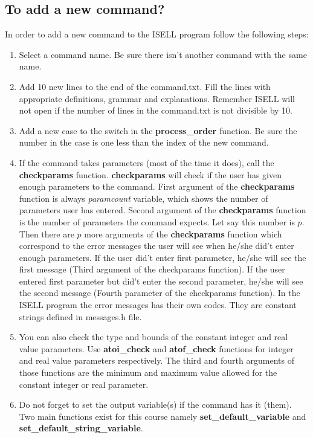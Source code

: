 \documentclass[a4paper,12pt]{book}
\begin{document}
\subsection{To add a new command?}
\label{sec-addcommand}
In order to add a new command to the ISELL program follow the following steps:
\begin{enumerate}
\item Select a command name. Be sure there isn't another command with the same name.
\item Add 10 new lines to the end of the command.txt. Fill the lines with appropriate definitions, grammar and explanations. Remember ISELL will not open if the number of lines in the command.txt is not divisible by 10.
\item Add a new case to the switch in the {\bf process\_order} function. Be sure the number in the case is one less than the index of the new command.
\item If the command takes parameters (most of the time it does), call the {\bf checkparams} function. {\bf checkparams} will check if the user has given enough parameters to the command. First argument of the {\bf checkparams} function is always {\em paramcount} variable, which shows the number of parameters user has entered. Second argument of the {\bf checkparams} function is the number of parameters the command expects. Let say this number is $p$. Then there are $p$ more arguments of the {\bf checkparams} function which correspond to the error messages the user will see when he/she did't enter enough parameters. If the user did't enter first parameter, he/she will see the first message (Third argument of the checkparams function). If the user entered first parameter but did't enter the second parameter, he/she will see the second message (Fourth parameter of the checkparams function). In the ISELL program the error messages has their own codes. They are constant strings defined in messages.h file.
\item You can also check the type and bounds of the constant integer and real value parameters. Use {\bf atoi\_check} and {\bf atof\_check} functions for integer and real value parameters respectively. The third and fourth arguments of those functions are the minimum and maximum value allowed for the constant integer or real parameter.
\item Do not forget to set the output variable(s) if the command has it (them). Two main functions exist for this course namely {\bf set\_default\_variable} and {\bf set\_default\_string\_variable}.
\end{enumerate}
\end{document}
